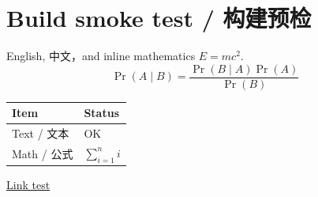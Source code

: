 \documentclass[11pt,a4paper]{article}
\begin{document}
\section*{Build smoke test / 构建预检}
English, 中文，and inline mathematics $E=mc^2$.
\[
  \Pr(A\mid B)=\frac{\Pr(B\mid A)\Pr(A)}{\Pr(B)}
\]
\begin{tabular}{ll}
\toprule
Item & Status \\
\midrule
Text / 文本 & OK \\
Math / 公式 & $\sum_{i=1}^{n} i$ \\
\bottomrule
\end{tabular}

\href{https://example.com}{Link test}
\end{document}
